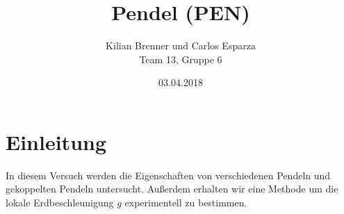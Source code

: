 \documentclass[12pt,a4paper]{article}
\title{Pendel (PEN)}
\author{Kilian Brenner und Carlos Esparza \\ Team 13, Gruppe 6}
\date{03.04.2018}
\begin{document}
\maketitle
\tableofcontents
\newpage
\section{Einleitung}
In diesem Versuch werden die Eigenschaften von verschiedenen Pendeln und gekoppelten Pendeln untersucht. Außerdem erhalten wir eine Methode um die lokale Erdbeschleunigung $g$ experimentell zu bestimmen. 










%
\end{document}
